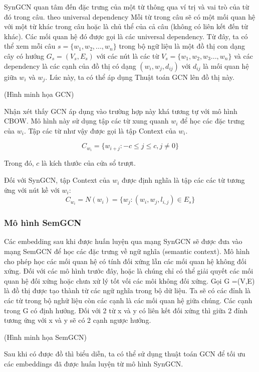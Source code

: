 SynGCN quan tâm đến đặc trưng của một từ thông qua ví trị và vai trò của từ đó trong câu. theo universal dependency Mỗi từ trong câu sẽ có một mối quan hệ với một từ khác trong câu hoặc là chủ thể của cả câu (không có liên kết đến từ khác). Các mối quan hệ đó được gọi là các universal dependency. Từ đây, ta có thể xem mỗi câu $s = \{w_1, w_2,...,w_n\}$ trong bộ ngữ liệu là một đồ thị con dạng cây có hướng $G_s = (V_s, E_s)$ với các nút là các từ $V_s=\{w_1, w_2, w_3...,w_n\}$ và các dependency là các cạnh của đồ thị có dạng $(w_i, w_j, d_{ij})$ với $d_{ij}$ là mối quan hệ giữa $w_i$ và $w_j$. Lúc này, ta có thể áp dụng Thuật toán GCN lên đồ thị này. 

(Hình minh họa GCN)

Nhận xét thấy GCN áp dụng vào trường hợp này khá tương tự với mô hình CBOW. Mô hình này sử dụng tập các từ xung quanh $w_i$ để học các đặc trưng của $w_i$. Tập các từ như vậy được gọi là tập Context của $w_i$.

\begin{equation*}
	C_{w_i} = \{w_{i+j}: -c \leq j \leq c, j \neq 0\}
\end{equation*}

Trong đó, $c$ là kích thước của cửa sổ trượt.

Đối với SynGCN, tập Context của $w_i$ được định nghĩa là tập các các từ tương ứng với nút kề với $w_i$:
\begin{equation*}
	C_{w_i} = N(w_i) = \{w_j: (w_i, w_j, l_{i,j}) \in E_s\}
\end{equation*}


\subsubsection{Mô hình SemGCN}

Các embedding sau khi được huấn luyện qua mạng SynGCN sẽ được đưa vào mạng SemGCN để học các đặc trưng về ngữ nghĩa (semantic context). Mô hình cho phép học các mối quan hệ có tính đối xứng lẫn các mối quan hệ không đối xứng. Đối với các mô hình trước đây, hoặc là chúng chỉ có thể giải quyết các mối quan hệ đối xứng hoặc chưa xử lý tốt vối các môi không đối xứng. Gọi G =(V,E) là đồ thị được tạo thành từ các ngữ nghĩa trong bộ dữ liệu. Ta sẽ có các đỉnh là các từ trong bộ nghữ liệu còn các cạnh là các mối quan hệ giữa chúng. Các cạnh trong G có định hướng. Đối với 2 từ x và y có liên kết đối xứng thì giữa 2 đỉnh tương ứng với x và y sẽ có 2 cạnh ngược hướng.

(Hình minh họa SemGCN)

Sau khi có được đồ thì biểu diễn, ta có thể sử dụng thuật toán GCN để tối ưu các embeddings đã được huấn luyện từ mô hình SynGCN.